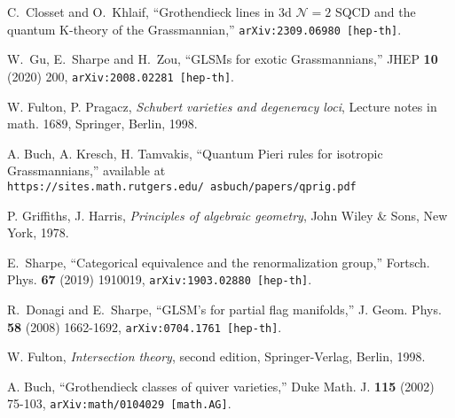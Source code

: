\documentclass[12pt]{article}
\begin{document}
\begin{thebibliography}{199}



C.~Closset and O.~Khlaif,
``Grothendieck lines in 3d $\mathcal{N}=2$ SQCD and the quantum K-theory of the Grassmannian,''
{\tt arXiv:2309.06980 [hep-th]}.

W.~Gu, E.~Sharpe and H.~Zou,
``GLSMs for exotic Grassmannians,''
JHEP \textbf{10} (2020) 200,
{\tt arXiv:2008.02281 [hep-th]}.

 W. Fulton, P. Pragacz, {\it Schubert varieties and degeneracy
loci}, Lecture notes in math. 1689, Springer, Berlin, 1998.

 A. Buch, A. Kresch, H. Tamvakis, ``Quantum Pieri rules for
isotropic Grassmannians,''
available at
{\tt https://sites.math.rutgers.edu/~asbuch/papers/qprig.pdf}


 P. Griffiths, J. Harris, {\it Principles of algebraic
geometry}, John Wiley \& Sons, New York, 1978.

E.~Sharpe,
``Categorical equivalence and the renormalization group,''
Fortsch. Phys. \textbf{67} (2019)  1910019,
{\tt arXiv:1903.02880 [hep-th]}.

R.~Donagi and E.~Sharpe,
``GLSM's for partial flag manifolds,''
J. Geom. Phys. \textbf{58} (2008) 1662-1692,
{\tt arXiv:0704.1761 [hep-th]}.

 W. Fulton, {\it Intersection theory}, second edition,
Springer-Verlag, Berlin, 1998.

 A. Buch, ``Grothendieck classes of quiver varieties,''
Duke Math. J. {\bf 115} (2002) 75-103,
{\tt arXiv:math/0104029 [math.AG]}.


\end{thebibliography}
\end{document}
